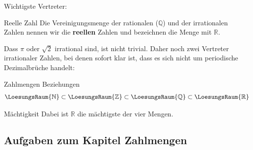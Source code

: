Wichtigste Vertreter:


\begin{definition}{Reelle Zahl}{}
Die Vereinigungsmenge der rationalen ($\mathbb{Q}$) und der irrationalen Zahlen
nennen wir die \textbf{reellen} Zahlen und bezeichnen die Menge mit $\mathbb{R}$.
\end{definition}


Dass $\pi$ oder $\sqrt{2}$ irrational sind, ist nicht trivial. Daher
noch zwei Vertreter irrationaler Zahlen, bei denen sofort klar ist,
dass es sich nicht um periodische Dezimalbrüche handelt:


\begin{gesetz}{Zahlmengen Beziehungen}{}
$$\LoesungsRaum{\mathbb{N}} \subset \LoesungsRaum{\mathbb{Z}} \subset
  \LoesungsRaum{\mathbb{Q}} \subset \LoesungsRaum{\mathbb{R}} $$%
\end{gesetz}


\begin{bemerkung}{Mächtigkeit}{}
  Dabei ist $\mathbb{R}$ die mächtigste der vier Mengen. 
\end{bemerkung}



\subsection*{Aufgaben zum Kapitel Zahlmengen}


